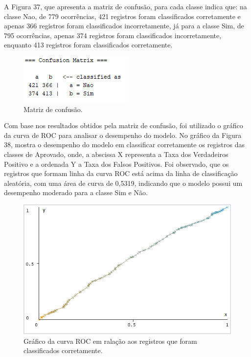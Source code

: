 A Figura 37, que apresenta a matriz de confusão, para cada classe indica que: na classe Nao, de 779 ocorrências, 421 registros foram classificados corretamente e apenas 366 registros foram classificados incorretamente, já para a classe Sim, de 795 ocorrências, apenas 374 registros foram classificados incorretamente, enquanto 413 registros foram classificados corretamente.

\par
\begin{figure}[!htp]
	\begin{center}
    \caption{\label{fig:waveform_fig} Matriz de confusão.}
	\includegraphics[scale=0.99]{Figuras/Matriz_de_classificacao.png}
	\end{center}
\end{figure}

\par
Com base nos resultados obtidos pela matriz de confusão, foi utilizado o gráfico da curva de ROC para analisar o desempenho do modelo. No gráfico da Figura 38, mostra o desempenho do modelo em classificar corretamente os registros das classes de Aprovado, onde, a abscissa X representa a Taxa dos Verdadeiros Positivo e a ordenada Y a Taxa dos Falsos Positivos. Foi observado, que os registros que formam linha da curva ROC está acima da linha de classificação aleatória, com uma área de curva de 0,5319, indicando que o modelo possui um desempenho moderado para a classe Sim e Não.

\par
\begin{figure}[!htp]
	\begin{center}
    \caption{\label{fig:waveform_fig} Gráfico da curva ROC em ralação aos registros que foram classificados corretamente.} 
	\includegraphics[scale=0.80]{Figuras/Curva_roc_projeto.png}
	\end{center}
\end{figure}

